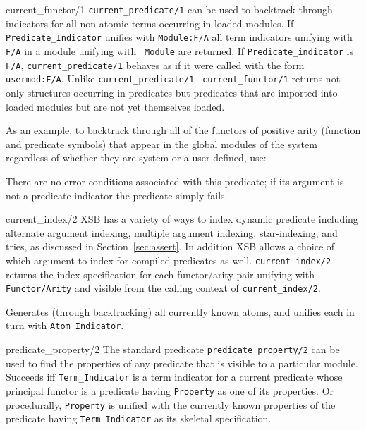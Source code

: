 \begin{description}
{current\_functor/1}
{\tt current\_predicate/1} can be used to backtrack through indicators
for all non-atomic terms occurring in loaded modules.  If {\tt
Predicate\_Indicator} unifies with {\tt Module:F/A} all term
indicators unifying with {\tt F/A} in a module unifying with {\tt
Module} are returned.  If {\tt Predicate\_indicator} is {\tt F/A},
{\tt current\_predicate/1} behaves as if it were called with the form
{\tt usermod:F/A}.  Unlike {\tt current\_predicate/1} {\tt
current\_functor/1} returns not only structures occurring in
predicates but predicates that are imported into loaded modules but
are not yet themselves loaded.

As an example, to backtrack through all of the functors of positive
arity (function and predicate symbols) that appear in the global
modules of the system regardless of whether they are system or a user
defined, use:


    There are no error conditions associated with this predicate; if its 
    argument is not a predicate indicator the predicate simply fails.

{current\_index/2}
%
XSB has a variety of ways to index dynamic predicate including
alternate argument indexing, multiple argument indexing,
star-indexing, and tries, as discussed in Section~\ref{sec:assert}.
In addition XSB allows a choice of which argument to index for
compiled predicates as well.  {\tt current\_index/2} returns the index
specification for each functor/arity pair unifying with {\tt
Functor/Arity} and visible from the calling context of  {\tt current\_index/2}.

    Generates (through backtracking) all currently known atoms, and unifies
    each in turn with {\tt Atom\_Indicator}. 

\label{PredProp}
{predicate\_property/2}
    The standard predicate {\tt predicate\_property/2} can be used to find 
    the properties of any predicate that is visible to a particular module.
    Succeeds iff {\tt Term\_Indicator} is a term indicator for a current 
    predicate whose principal functor is a predicate having {\tt Property} 
    as one of its properties. Or procedurally, {\tt Property} is unified 
    with the currently known properties of the predicate having 
    {\tt Term\_Indicator} as its skeletal specification.
    

\end{description}
